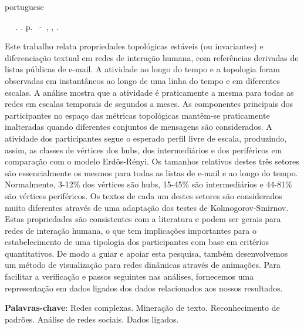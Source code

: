 \documentclass[
12pt,		%
openright,	%
twoside,  %
a4paper,			%
chapter=TITLE,		%
english,			%
french,				%
spanish,			%
brazil				%
]{USPSC}
\begin{document}
\setlength{\absparsep}{18pt} %
\begin{resumo}[Resumo]
 \begin{otherlanguage*}{portuguese}
	\begin{flushleft}\footnotesize 
			\setlength{\absparsep}{0pt} %
			\SingleSpacing 
			\imprimirautorabr~ ~\textbf{\imprimirtitulo}.	\imprimirdata. \pageref{LastPage}p. 
			\imprimirtipotrabalho~-~\imprimirinstituicao, \imprimirlocal, \imprimirdata. 
 	\end{flushleft}
\OnehalfSpacing 			
	 Este trabalho relata propriedades topológicas estáveis (ou invariantes) e diferenciação textual em redes de interação humana,
	 com referências derivadas de listas públicas de e-mail.
	 A atividade ao longo do tempo e a topologia foram observadas em instantâneos ao longo de uma linha do tempo e em
	 diferentes escalas.
	 A análise mostra que a atividade é praticamente a mesma para todas as redes em escalas temporais
	 de segundos a meses.
	 As componentes principais dos participantes no espaço das métricas topológicas
	 mantêm-se praticamente inalteradas quando diferentes conjuntos de mensagens são considerados.
	 A atividade dos participantes
	 segue o esperado perfil livre de escala, produzindo, assim, as classes de vértices dos hubs, dos intermediários e dos periféricos em
	 comparação com o modelo Erdös-Rényi.
	 Os tamanhos relativos destes três setores são essencialmente os mesmos
	 para todas as listas de e-mail e ao longo do tempo.
	 Normalmente, 3-12\% dos vértices são hubs, 15-45\% são intermediários
	 e 44-81\% são vértices periféricos.
	 Os textos de cada um destes setores são considerados muito diferentes através de uma adaptação dos testes de Kolmogorov-Smirnov.
	 Estas propriedades são consistentes com a literatura e podem ser gerais para
	 redes de interação humana, o que tem implicações importantes para o estabelecimento de uma tipologia dos participantes com base em
	 critérios quantitativos.
	 De modo a guiar e apoiar esta pesquisa, também desenvolvemos um método de visualização para redes dinâmicas através de animações.
	 Para facilitar a verificação e passos seguintes nas análises, fornecemos uma representação em dados ligados dos dados relacionados aos nossos resultados.

 \textbf{Palavras-chave}: Redes complexas. Mineração de texto. Reconhecimento de padrões. Análise de redes sociais. Dados ligados.
 \end{otherlanguage*}
\end{resumo}
\end{document}
